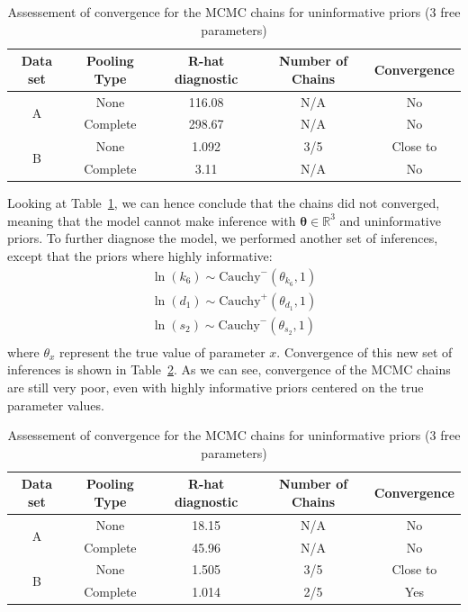 \documentclass[11pt]{article}
\begin{document}
\begin{table}[!h]
    \centering
    \caption{Assessement of convergence for the MCMC chains for uninformative priors (3 free parameters)}
    \begin{tabular}{c|c||c|c|c}
        \hline
        Data set & Pooling Type & R-hat diagnostic & Number of Chains & Convergence  \\ \hline 
        \multirow{2}{*}{A}      & None  & 116.08 & N/A & No \\
                                & Complete & 298.67 & N/A & No \\ \hline 
        \multirow{2}{*}{B}      & None  & 1.092 & 3/5 & Close to \\
                                & Complete & 3.11 & N/A & No \\ \hline 
    \end{tabular}
    \label{tbl:rhat_2}
\end{table}
Looking at Table~\ref{tbl:rhat_2}, we can hence conclude that the chains did not converged, meaning that the model cannot make inference with $\boldsymbol{\theta} \in \mathbb{R}^3$ and uninformative priors. To further diagnose the model, we performed another set of inferences, except that the priors where highly informative:
\begin{align*}
    \ln(k_6) \sim \text{Cauchy}^-(\theta_{k_6}, 1) \\ 
    \ln(d_1) \sim \text{Cauchy}^+(\theta_{d_1}, 1) \\ 
    \ln(s_2) \sim \text{Cauchy}^-(\theta_{s_2}, 1) \\ 
\end{align*} 
where $\theta_x$ represent the true value of parameter $x$. Convergence of this new set of inferences is shown in Table~\ref{tbl:rhat_3}. As we can see, convergence of the MCMC chains are still very poor, even with highly informative priors centered on the true parameter values.
\begin{table}[!h]
    \centering
    \caption{Assessement of convergence for the MCMC chains for uninformative priors (3 free parameters)}
    \begin{tabular}{c|c||c|c|c}
        \hline
        Data set & Pooling Type & R-hat diagnostic & Number of Chains & Convergence  \\ \hline 
        \multirow{2}{*}{A}      & None  & 18.15 & N/A & No \\
                                & Complete & 45.96 & N/A & No \\ \hline 
        \multirow{2}{*}{B}      & None  & 1.505 & 3/5 & Close to \\
                                & Complete & 1.014 & 2/5 & Yes \\ \hline 
    \end{tabular}
    \label{tbl:rhat_3}
\end{table}
\end{document}

